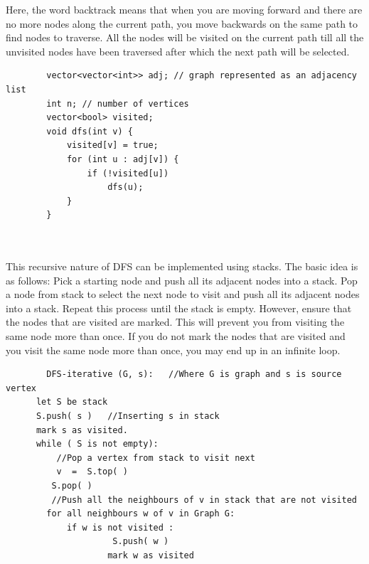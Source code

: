 \documentclass[12pt]{article}
\begin{document}
        Here, the word backtrack means that when you are moving forward and there are no more nodes along the current path, you move backwards on the same path to find nodes to traverse. All the nodes will be visited on the current path till all the unvisited nodes have been traversed after which the next path will be selected. \cite{18}
        \begin{verbatim}
        vector<vector<int>> adj; // graph represented as an adjacency list
        int n; // number of vertices
        vector<bool> visited;
        void dfs(int v) {
            visited[v] = true;
            for (int u : adj[v]) {
                if (!visited[u])
                    dfs(u);
            }
        }
        
        
    \end{verbatim}
    This recursive nature of DFS can be implemented using stacks. The basic idea is as follows:
    Pick a starting node and push all its adjacent nodes into a stack.
    Pop a node from stack to select the next node to visit and push all its adjacent nodes into a stack.
    Repeat this process until the stack is empty. However, ensure that the nodes that are visited are marked. This will prevent you from visiting the same node more than once. If you do not mark the nodes that are visited and you visit the same node more than once, you may end up in an infinite loop. \cite{18}
    
   \begin{verbatim}
        DFS-iterative (G, s):   //Where G is graph and s is source vertex
      let S be stack
      S.push( s )   //Inserting s in stack 
      mark s as visited.
      while ( S is not empty):
          //Pop a vertex from stack to visit next
          v  =  S.top( )
         S.pop( )
         //Push all the neighbours of v in stack that are not visited   
        for all neighbours w of v in Graph G:
            if w is not visited :
                     S.push( w )         
                    mark w as visited
    \end{verbatim}
\end{document}
